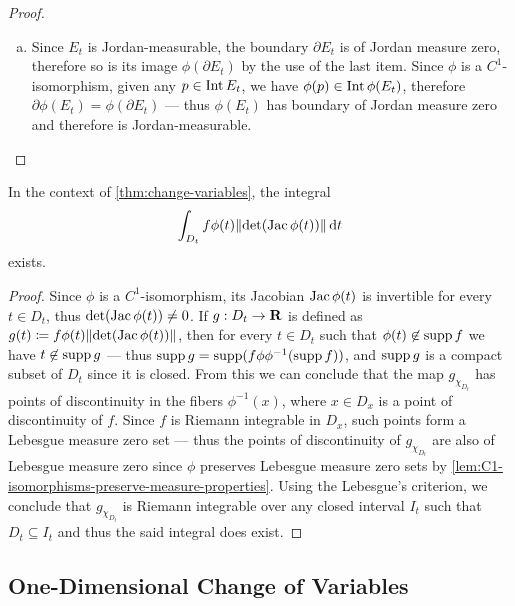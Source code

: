 \begin{proof}
\begin{enumerate}[(a)]
        \item Since \(E_t\) is Jordan-measurable, the boundary \(\partial E_t\) is of
              Jordan measure zero, therefore so is its image \(\phi(\partial E_t)\) by the
              use of the last item. Since \(\phi\) is a \(C^1\)-isomorphism, given any \(p \in
              \operatorname{Int} E_t\), we have \(\phi(p) \in \operatorname{Int} \phi(E_t)\), therefore \(\partial
              \phi(E_t) = \phi(\partial E_t)\) --- thus \(\phi(E_t)\) has boundary of Jordan
              measure zero and therefore is Jordan-measurable.
    \end{enumerate}
\end{proof}

\begin{corollary}
    \label{cor:existence-right-int-change-variables}
    In the context of \cref{thm:change-variables}, the integral
    \[
        \int_{D_t} f\phi(t) \lVert\det(\operatorname{Jac} \phi(t))\rVert\, \mathrm{d} t
    \]
    exists.
\end{corollary}

\begin{proof}
    Since \(\phi\) is a \(C^1\)-isomorphism, its Jacobian \(\operatorname{Jac} \phi(t)\) is invertible
    for every \(t \in D_t\), thus \(\det(\operatorname{Jac} \phi(t)) \neq 0\). If \(g: D_t \to \mathbf{R}\)
    is defined as \(g(t) \coloneq f \phi(t) \lVert\det(\operatorname{Jac} \phi(t))\rVert\), then for
    every \(t \in D_t\) such that \(\phi(t) \not\in \operatorname{supp} f\) we have \(t \not\in
    \operatorname{supp} g\) --- thus \(\operatorname{supp} g = \operatorname{supp}(f \phi \phi^{-1}(\operatorname{supp} f))\), and \(\operatorname{supp}
    g\) is a compact subset of \(D_t\) since it is closed. From this we can conclude
    that the map \(g_{\chi_{D_t}}\) has points of discontinuity in the fibers
    \(\phi^{-1}(x)\), where \(x \in D_x\) is a point of discontinuity of
    \(f\). Since \(f\) is Riemann integrable in \(D_x\), such points form a
    Lebesgue measure zero set --- thus the points of discontinuity of
    \(g_{\chi_{D_t}}\) are also of Lebesgue measure zero since \(\phi\) preserves
    Lebesgue measure zero sets by
    \cref{lem:C1-isomorphisms-preserve-measure-properties}. Using the Lebesgue's
    criterion, we conclude that \(g_{\chi_{D_t}}\) is Riemann integrable over
    any closed interval \(I_t\) such that \(D_t \subseteq I_t\) and thus the said
    integral does exist.
\end{proof}

\subsection{One-Dimensional Change of Variables}

